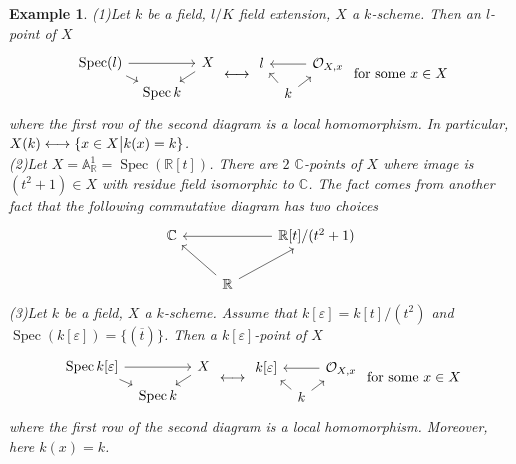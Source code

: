 \documentclass{ctexart}
\newtheorem{example}{Example}[section]
\newcommand{\spec}{\operatorname{Spec}}
\begin{document}
\begin{example}
    (1)Let $k$ be a field, $l/K$ field extension, $X$ a $k$-scheme.
    Then an $l$-point of $X$
    \begin{equation*}
        \begin{tikzcd}[sep = tiny]
            \spec(l) \arrow[rr] \arrow[dr] &&
            X \arrow[dl] \\
            & \spec k &
        \end{tikzcd}
        \longleftrightarrow
        \begin{tikzcd}[sep = tiny]
            l \arrow[rr, leftarrow] \arrow[dr, leftarrow] &&
            \mathcal{O}_{X, x} \arrow[dl, leftarrow] \\
            & k &
        \end{tikzcd}
        \text{ for some $x\in X$}
    \end{equation*}
    where the first row of the second diagram is a local homomorphism.
    In particular, $X(k) \longleftrightarrow \{x\in X \big{|} k(x) = k\}$. \\
    (2)Let $X = \mathbb{A}_{\mathbb{R}}^{1} = \spec(\mathbb{R}[t])$.
    There are $2$ $\mathbb{C}$-points of $X$ where image is $(t^{2} + 1)\in X$ with residue field isomorphic to $\mathbb{C}$.
    The fact comes from another fact that the following commutative diagram has two choices
    \begin{equation*}
        \begin{tikzcd}
            \mathbb{C} \arrow[rr, leftarrow] \arrow[dr, leftarrow] &&
            \mathbb{R}[t]/(t^{2} + 1) \arrow[dl, leftarrow] \\
            & \mathbb{R} &
        \end{tikzcd}
    \end{equation*}
    (3)Let $k$ be a field, $X$ a $k$-scheme.
    Assume that $k[\varepsilon] = k[t]/(t^{2})$ and $\spec(k[\varepsilon]) = \{(\overline{t})\}$.
    Then a $k[\varepsilon]$-point of $X$
    \begin{equation*}
        \begin{tikzcd}[sep = tiny]
            \spec k[\varepsilon] \arrow[rr] \arrow[dr] &&
            X \arrow[dl] \\
            & \spec k &
        \end{tikzcd}
        \longleftrightarrow
        \begin{tikzcd}[sep = tiny]
            k[\varepsilon] \arrow[rr, leftarrow] \arrow[dr, leftarrow] &&
            \mathcal{O}_{X, x} \arrow[dl, leftarrow] \\
            & k &
        \end{tikzcd}
        \text{ for some $x\in X$}
    \end{equation*}
    where the first row of the second diagram is a local homomorphism.
    Moreover, here $k(x) = k$.
\end{example}
\end{document}
